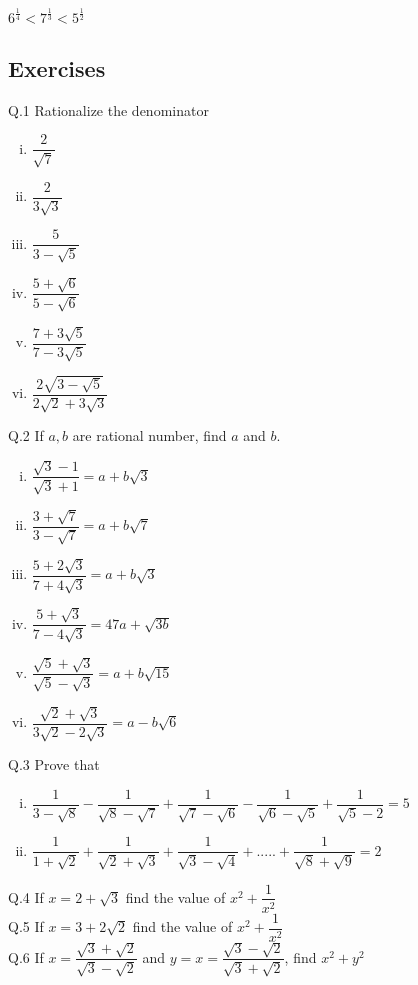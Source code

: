 $6^\frac{1}{4} < 7^\frac{1}{3} < 5^\frac{1}{2}$
\subsection{Exercises}
Q.1 Rationalize the denominator 
\begin{multicols}{3}
\begin{enumerate}[(i)]
\item $\dfrac{2}{\sqrt{7}}$
\item $\dfrac{2}{3\sqrt{3}}$
\item $\dfrac{5}{3-\sqrt{5}}$
\item $\dfrac{5+\sqrt{6}}{5-\sqrt{6}}$
\item $\dfrac{7+3\sqrt{5}}{7-3\sqrt{5}}$
\item $\dfrac{2\sqrt{3-\sqrt{5}}}{2\sqrt{2}+3\sqrt{3}}$
\end{enumerate}
\end{multicols}
\noindent Q.2 If $a,b$ are rational number, find $a$ and $b$.
\begin{multicols}{3}
\begin{enumerate}[(i)]
\item $\dfrac{\sqrt{3}-1}{\sqrt{3}+1} = a+b\sqrt{3}$
\item $\dfrac{3+\sqrt{7}}{3-\sqrt{7}} = a+b\sqrt{7}$
\item $\dfrac{5+2\sqrt{3}}{7+4\sqrt{3}} = a+b\sqrt{3}$
\item $\dfrac{5+\sqrt{3}}{7-4\sqrt{3}} = 47a+\sqrt{3b}$
\item $\dfrac{\sqrt{5}+\sqrt{3}}{\sqrt{5}-\sqrt{3}} = a+b\sqrt{15}$
\item $\dfrac{\sqrt{2}+\sqrt{3}}{3\sqrt{2}-2\sqrt{3}} = a-b\sqrt{6}$
\end{enumerate}
\end{multicols}
\noindent Q.3 Prove that
\begin{enumerate}[(i)]
\item $\dfrac{1}{3-\sqrt{8}} - \dfrac{1}{\sqrt{8}-\sqrt{7}} + \dfrac{1}{\sqrt{7}-\sqrt{6}} - \dfrac{1}{\sqrt{6}-\sqrt{5}} + \dfrac{1}{\sqrt{5}-2} = 5$
\item $\dfrac{1}{1+\sqrt{2}} + \dfrac{1}{\sqrt{2}+\sqrt{3}} + \dfrac{1}{\sqrt{3}-\sqrt{4}} +.....+ \dfrac{1}{\sqrt{8}+\sqrt{9}} = 2$
\end{enumerate}
Q.4 If $x = 2+\sqrt{3}$ find the value of $x^2+\dfrac{1}{x^2}$\\
Q.5 If $x = 3+2\sqrt{2}$ find the value of $x^2+\dfrac{1}{x^2}$\\
Q.6 If $x = \dfrac{\sqrt{3}+\sqrt{2}}{\sqrt{3}-\sqrt{2}}$ and $y = x = \dfrac{\sqrt{3}-\sqrt{2}}{\sqrt{3}+\sqrt{2}}$, find $x^2+y^2$\\
